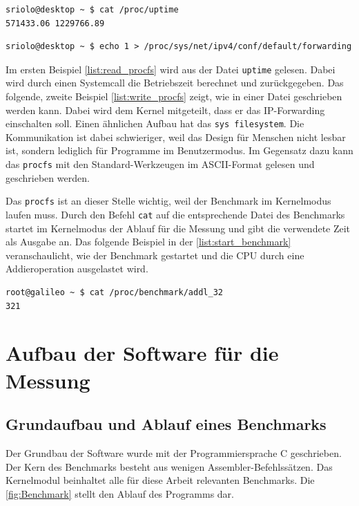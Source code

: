 \lstset{language=bash}
\begin{minipage}{\linewidth}
\begin{lstlisting}[label={list:read_procfs},caption={Lesen im procfs}]
sriolo@desktop ~ $ cat /proc/uptime 
571433.06 1229766.89
\end{lstlisting}
\begin{lstlisting}[label={list:write_procfs},caption={Schreiben im procfs}]
sriolo@desktop ~ $ echo 1 > /proc/sys/net/ipv4/conf/default/forwarding
\end{lstlisting}
\end{minipage}


Im ersten Beispiel \autoref{list:read_procfs} wird aus der Datei \texttt{uptime} gelesen. Dabei wird durch einen Systemcall die Betriebszeit berechnet und zurückgegeben. Das folgende, zweite Beispiel \autoref{list:write_procfs} zeigt, wie in einer Datei geschrieben werden kann. Dabei wird dem Kernel mitgeteilt, dass er das IP-Forwarding einschalten soll. Einen ähnlichen Aufbau hat das \texttt{sys filesystem}. Die Kommunikation ist dabei schwieriger, weil das Design für Menschen nicht lesbar ist, sondern lediglich für Programme im Benutzermodus. Im Gegensatz dazu kann das \texttt{procfs} mit den Standard-Werkzeugen im ASCII-Format gelesen und geschrieben werden.
\par
Das \texttt{procfs} ist an dieser Stelle wichtig, weil der Benchmark im Kernelmodus laufen muss. Durch den Befehl \texttt{cat} auf die entsprechende Datei des Benchmarks startet im Kernelmodus der Ablauf für die Messung und gibt die verwendete Zeit als Ausgabe an. Das folgende Beispiel in der \autoref{list:start_benchmark} veranschaulicht, wie der Benchmark gestartet und die CPU durch eine Addieroperation ausgelastet wird.

\lstset{language=bash}
\begin{minipage}{\linewidth}
\begin{lstlisting}[label={list:start_benchmark},caption={Starten des Benchmarks}]
root@galileo ~ $ cat /proc/benchmark/addl_32
321
\end{lstlisting}
\end{minipage}


\section{Aufbau der Software für die Messung}


\subsection{Grundaufbau und Ablauf eines Benchmarks}
Der Grundbau der Software wurde mit der Programmiersprache C geschrieben. Der Kern des Benchmarks besteht aus wenigen Assembler-Befehlssätzen. Das Kernelmodul beinhaltet alle für diese Arbeit relevanten Benchmarks. Die \autoref{fig:Benchmark} stellt den Ablauf des Programms dar.

